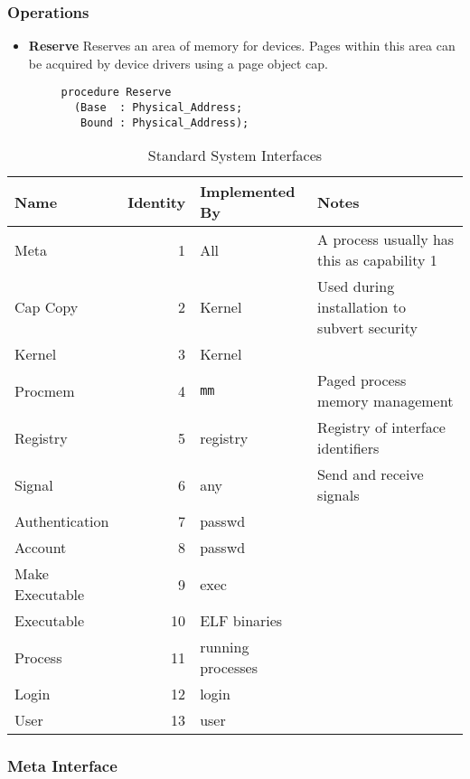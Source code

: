 \subsubsection{Operations}

\begin{itemize}
    \item \textbf{Reserve} Reserves an area of memory for devices.  Pages within this area can be acquired by device drivers using a page object cap.

    \begin{verbatim}
     procedure Reserve
       (Base  : Physical_Address;
        Bound : Physical_Address);
    \end{verbatim}
    
\end{itemize}

\begin{table}[ht]
\begin{tabular}{l r l l}
\hline\hline
Name & Identity & Implemented By & Notes \\ [0.5ex]
\hline
Meta            & 1 & All & A process usually has this as capability 1 \\
Cap Copy        & 2 & Kernel & Used during installation to subvert security \\
Kernel          & 3 & Kernel & \\
Procmem         & 4 & {\tt mm} & Paged process memory management \\
Registry        & 5 & registry & Registry of interface identifiers\\
Signal          & 6 & any & Send and receive signals \\
Authentication  & 7 & passwd & \\
Account         & 8 & passwd & \\
Make Executable & 9 & exec & \\
Executable      & 10 & ELF binaries & \\
Process         & 11 & running processes & \\
Login           & 12 & login & \\
User            & 13 & user & \\
\hline %
\end{tabular}
\caption{Standard System Interfaces} %
\label{table:system_interfaces} %
\end{table}

\subsubsection{Meta Interface}


